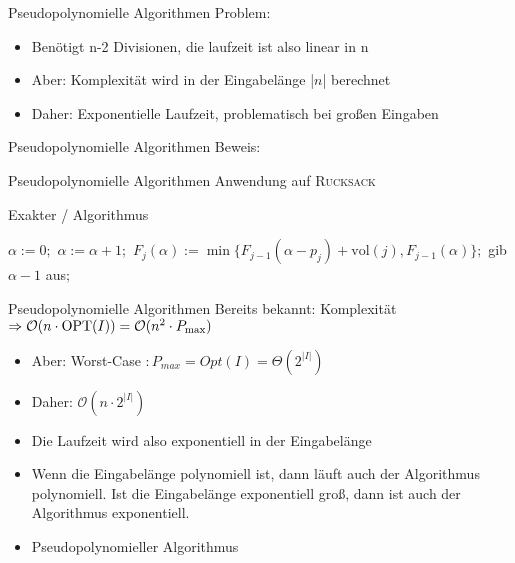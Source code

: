 \begin{frame}{Pseudopolynomielle Algorithmen}
Problem:

\begin{itemize}
\item
Benötigt n-2 Divisionen, die laufzeit ist also linear in n
\item
Aber: Komplexität wird in der Eingabelänge |$n$| berechnet
\item
Daher: Exponentielle Laufzeit, problematisch bei großen Eingaben

\end{itemize}
\end{frame}

\begin{frame}{Pseudopolynomielle Algorithmen}
Beweis:

\end{frame}

\begin{frame}{Pseudopolynomielle Algorithmen}
Anwendung auf \textsc{Rucksack}
\newline

\begin{algorithm}[H]
    \caption{Exakter \rucksack/ Algorithmus}
        \begin{algorithmic}
            \State $\alpha:=0;$
            \Repeat
            \State $\alpha:=\alpha+1;$
            \State $F_j(\alpha):=\min\{F_{j-1}(\alpha-p_j)+\text{vol}(j),F_{j-1}(\alpha)\};$
            \EndFor
            \State gib $\alpha-1$ aus$;$
        \end{algorithmic}
\end{algorithm}

\end{frame}

\begin{frame}{Pseudopolynomielle Algorithmen}
Bereits bekannt: Komplexität $\Rightarrow \mathcal{O}( n \cdot \operatorname{OPT}(I)) = \mathcal{O}( n^2 \cdot P_{\max})$ 
\begin{itemize}
\item
Aber: Worst-Case $: P_{max} = Opt(I) = \Theta(2^{|I|})$
\item
Daher: 
$\mathcal{O}(n\cdot 2^{|I|})$
\item
Die Laufzeit wird also exponentiell in der Eingabelänge
\item
Wenn die Eingabelänge polynomiell ist, dann läuft auch der Algorithmus polynomiell. Ist die Eingabelänge exponentiell groß, dann ist auch der Algorithmus exponentiell.
\item
\Rightarrow Pseudopolynomieller Algorithmus


\end{itemize}
\end{frame}
